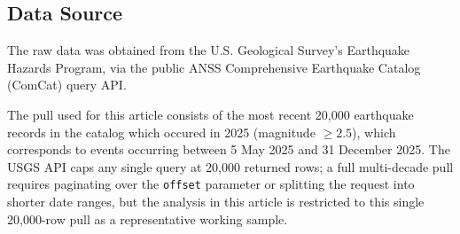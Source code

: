 \documentclass[10pt]{article}
\begin{document}
\subsection{Data Source}

The raw data was obtained from the U.S. Geological Survey's Earthquake Hazards
Program, via the public ANSS Comprehensive Earthquake Catalog (ComCat) query API\cite{earthquakes-api}.

The pull used for this article consists of the most recent 20{,}000 earthquake
records in the catalog which occured in 2025 (magnitude $\geq 2.5$), which
corresponds to events occurring between 5 May 2025 and 31 December 2025. The USGS
API caps any single query at 20{,}000 returned rows; a full multi-decade pull
requires paginating over the \texttt{offset} parameter or splitting the request
into shorter date ranges, but the analysis in this article is restricted to this
single 20{,}000-row pull as a representative working sample.
\end{document}
